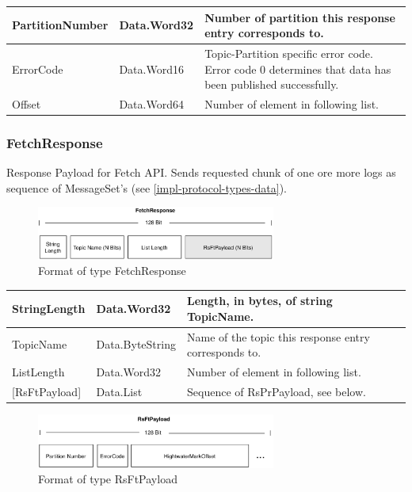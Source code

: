 \begin{table}[H]
\centering
\begin{tabular}{ l  l  p{10cm} }
\hline
PartitionNumber & Data.Word32 & Number of partition this response entry
corresponds to.                                                \\ \hline
ErrorCode       & Data.Word16 & Topic-Partition specific error code. Error code
0 determines that data has been published successfully. \\ \hline
Offset          & Data.Word64 & Number of element in following list.
\\ \hline
\end{tabular}
\end{table}

\subsubsection{FetchResponse}
Response Payload for Fetch API. Sends requested chunk of one ore more logs as
sequence of MessageSet's (see \ref{impl-protocol-types-data}). 

\begin{figure}[H]
    \centering
    \includegraphics[width=0.7\textwidth]{images/impl-prot-types-fetchResponse.png}
    \caption{Format of type FetchResponse}
\end{figure}

\begin{table}[H]
\centering
\begin{tabular}{ l  l  p{10cm} }
\hline
StringLength      & Data.Word32     & Length, in bytes, of string TopicName. \\ \hline
TopicName         & Data.ByteString & Name of the topic this response entry corresponds to.\\ \hline
ListLength        & Data.Word32     & Number of element in following list.\\ \hline
{[}RsFtPayload{]} & Data.List       & Sequence of RsPrPayload, see below.
\\ \hline
\end{tabular}
\end{table}

\begin{figure}[H]
    \centering
    \includegraphics[width=0.7\textwidth]{images/impl-prot-types-ftPayload.png}
    \caption{Format of type RsFtPayload}
\end{figure}

